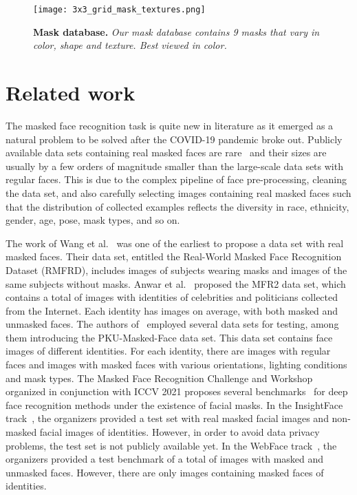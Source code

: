\documentclass{article}
\begin{document}
\begin{figure}[t] 
\begin{center}
   \texttt{[image: 3x3\_grid\_mask\_textures.png]}
\end{center}
\vspace{-0.3cm}
   \caption{{\bf Mask database. }\emph {Our mask database contains 9 masks that vary in color, shape and texture. Best viewed in color.}}
\label{fig:mask-database} 
\end{figure}

\section{Related work}

The masked face recognition task is quite new in literature as it emerged as a natural problem to be solved after the COVID-19 pandemic broke out. 
Publicly available data sets containing real masked faces are rare~\cite{wang2020arxiv,anwar2020arxiv,zhu2021arxiv} and their sizes are usually by a few orders of magnitude smaller than the large-scale data sets with regular faces. 
This is due to the complex pipeline of face pre-processing, cleaning the data set, and also carefully selecting images containing real masked faces such that the distribution of collected examples reflects the diversity in race, ethnicity, gender, age, pose, mask types, and so on.

The work of Wang et al.~\cite{wang2020arxiv} was one of the earliest to propose a data set with real masked faces. Their data set, entitled the Real-World Masked Face Recognition Dataset (RMFRD), includes  images of  subjects wearing masks and  images of the same  subjects without masks. 
Anwar et al.~\cite{anwar2020arxiv} proposed the MFR2 data set, which contains a total of  images with  identities of celebrities and politicians collected from the Internet. Each identity has  images on average, with both masked and unmasked faces. 
The authors of~\cite{ding2020icm} employed several data sets for testing, among them introducing the PKU-Masked-Face data set. This data set contains  face images of  different identities. For each identity, there are  images with regular faces and  images with masked faces with various orientations, lighting conditions and mask types. 
The Masked Face Recognition Challenge and Workshop organized in conjunction with ICCV 2021 proposes several benchmarks~\cite{deng2021arxiv,zhu2021arxiv} for deep face recognition methods under the existence of facial masks. In the InsightFace track~\cite{deng2021arxiv}, the organizers provided a test set with  real masked facial images and  non-masked facial images of  identities. However, in order to avoid data privacy problems, the test set is not publicly available yet. In the WebFace track~\cite{zhu2021arxiv}, the organizers provided a test benchmark of a total of  images with masked and unmasked faces. However, there are only  images containing masked faces of  identities. 
\end{document}

